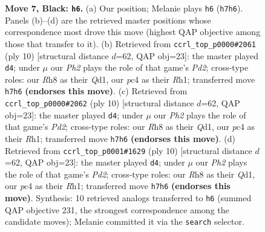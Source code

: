 \documentclass[11pt]{article}
\begin{document}
\begin{figure}[p]
\caption{\textbf{Move 7, Black: \texttt{h6}.} (a) Our position; Melanie plays \texttt{h6} (\texttt{h7h6}). Panels (b)--(d) are the retrieved master positions whose correspondence most drove this move (highest QAP objective among those that transfer to it). (b) Retrieved from \texttt{ccrl\_top\_p0000\#2061} (ply 10) [structural distance $d$=62, QAP obj=23]: the master played \texttt{d4}; under $\mu$ our \emph{Ph2} plays the role of that game's \emph{Pd2}; cross-type roles: our \emph{R}h8 as their \emph{Q}d1, our \emph{p}c4 as their \emph{R}h1; transferred move \texttt{h7h6} \textbf{(endorses this move)}. (c) Retrieved from \texttt{ccrl\_top\_p0000\#2062} (ply 10) [structural distance $d$=62, QAP obj=23]: the master played \texttt{d4}; under $\mu$ our \emph{Ph2} plays the role of that game's \emph{Pd2}; cross-type roles: our \emph{R}h8 as their \emph{Q}d1, our \emph{p}c4 as their \emph{R}h1; transferred move \texttt{h7h6} \textbf{(endorses this move)}. (d) Retrieved from \texttt{ccrl\_top\_p0001\#1629} (ply 10) [structural distance $d$=62, QAP obj=23]: the master played \texttt{d4}; under $\mu$ our \emph{Ph2} plays the role of that game's \emph{Pd2}; cross-type roles: our \emph{R}h8 as their \emph{Q}d1, our \emph{p}c4 as their \emph{R}h1; transferred move \texttt{h7h6} \textbf{(endorses this move)}. Synthesis: 10 retrieved analogs transferred to \texttt{h6} (summed QAP objective 231, the strongest correspondence among the candidate moves); Melanie committed it via the \texttt{search} selector.}
\label{fig:thought-m13}
\end{figure}

\clearpage
\end{document}
